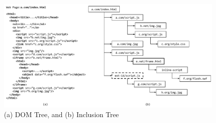 \begin{figure}[t]
   \centering
   \includegraphics[width=\textwidth]{inclusion/figures/dom_inclusion_tree}
   \caption{(a) DOM Tree, and (b) Inclusion Tree}
   \label{inclusion:fig:dom_inclusion_tree}
\end{figure}
